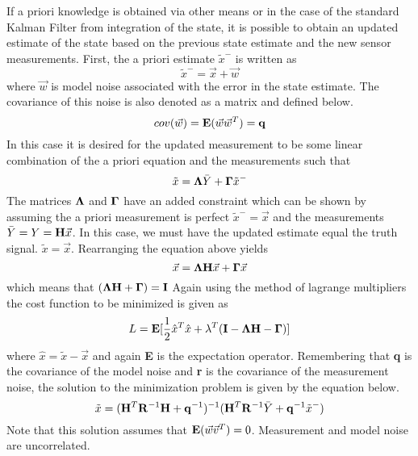 \documentclass{article}
\begin{document}
If a priori knowledge is obtained via other means or in the case of
the standard Kalman Filter from integration of the state, it is
possible to obtain an updated estimate of the state based on the
previous state estimate and the new sensor measurements. First, the a
priori estimate $\tilde{x}^{-}$ is written as 
\begin{equation}
  \tilde{x}^{-} = \vec{x} +  \vec{w}
\end{equation}
where $\vec{w}$ is model noise associated with the error in the
state estimate. The covariance of this noise is also denoted as a
matrix and defined below.
\begin{equation}
  cov(\vec{w}) = {\bf E}(\vec{w}\vec{w}^T) = {\bf q}
\end{equation}
In this case it is desired for the updated measurement to be some
linear combination of the a priori equation and the measurements such
that
\begin{equation}
  \tilde{x} = {\bf \Lambda}\bar{Y} + {\bf \Gamma}\tilde{x}^{-}
\end{equation}
The matrices ${\bf \Lambda}$ and ${\bf \Gamma}$ have an added constraint
which can be shown by assuming the a priori measurement is perfect
$\tilde{x}^- = \vec{x}$ and the measurements $\bar{Y} = Y = {\bf
  H}\vec{x}$. In this case, we must have the updated estimate equal
the truth signal. $\tilde{x} = \vec{x}$. Rearranging the equation above yields
\begin{equation}
  \vec{x} = {\bf \Lambda}{\bf H}\vec{x} + {\bf \Gamma}\vec{x}
\end{equation}
which means that $({\bf \Lambda}{\bf H} + {\bf \Gamma}) = {\bf I}$
Again using the method of lagrange multipliers the cost function to be
minimized is given as
\begin{equation}
  L = {\bf E}[\frac{1}{2}\hat{x}^T\hat{x} + \lambda^T({\bf I} - {\bf
    \Lambda}{\bf H} - {\bf \Gamma})]
\end{equation}
where $\hat{x} = \tilde{x} - \vec{x}$ and again {\bf E} is the
expectation operator. Remembering that {\bf q} is
the covariance of the model noise and {\bf r} is the covariance of the
measurement noise, the solution to the minimization problem is given
by the equation below. 
\begin{equation}
  \tilde{x} = ({\bf H}^T{\bf R}^{-1}{\bf H}+{\bf q}^{-1})^{-1}({\bf
    H}^T{\bf R}^{-1}\bar{Y}+{\bf q}^{-1}\tilde{x}^{-})
\end{equation}
Note that this solution assumes that ${\bf E}(\vec{w}\vec{v}^T) = 0$. Measurement and model noise are uncorrelated.
\end{document}
